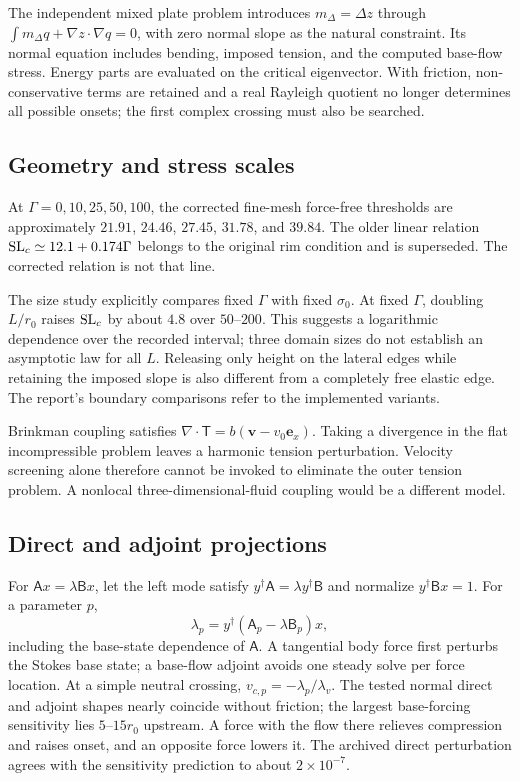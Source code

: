 The independent mixed plate problem introduces $m_\Delta=\Delta z$ through $\int m_\Delta q+\nabla z\cdot\nabla q=0$, with zero normal slope as the natural constraint. Its normal equation includes bending, imposed tension, and the computed base-flow stress. Energy parts are evaluated on the critical eigenvector. With friction, non-conservative terms are retained and a real Rayleigh quotient no longer determines all possible onsets; the first complex crossing must also be searched.

\subsection{Geometry and stress scales}
At $\Gamma=0,10,25,50,100$, the corrected fine-mesh force-free thresholds are approximately $21.91$, $24.46$, $27.45$, $31.78$, and $39.84$. The older linear relation $\mathrm{SL}_c\simeq12.1+0.174\Gamma$ belongs to the original rim condition and is superseded. The corrected relation is not that line.

The size study explicitly compares fixed $\Gamma$ with fixed $\sigma_0$. At fixed $\Gamma$, doubling $L/r_0$ raises $\mathrm{SL}_c$ by about $4.8$ over $50$--$200$. This suggests a logarithmic dependence over the recorded interval; three domain sizes do not establish an asymptotic law for all $L$. Releasing only height on the lateral edges while retaining the imposed slope is also different from a completely free elastic edge. The report's boundary comparisons refer to the implemented variants.

Brinkman coupling satisfies $\nabla\cdot\mathsf T=b(\bm v-v_0\bm e_x)$. Taking a divergence in the flat incompressible problem leaves a harmonic tension perturbation. Velocity screening alone therefore cannot be invoked to eliminate the outer tension problem. A nonlocal three-dimensional-fluid coupling would be a different model.

\subsection{Direct and adjoint projections}
For $\mathsf A x=\lambda\mathsf Bx$, let the left mode satisfy $y^\dagger\mathsf A=\lambda y^\dagger\mathsf B$ and normalize $y^\dagger\mathsf Bx=1$. For a parameter $p$,
\begin{equation}
\lambda_p=y^\dagger(\mathsf A_p-\lambda\mathsf B_p)x,
\end{equation}
including the base-state dependence of $\mathsf A$. A tangential body force first perturbs the Stokes base state; a base-flow adjoint avoids one steady solve per force location. At a simple neutral crossing, $v_{c,p}=-\lambda_p/\lambda_v$. The tested normal direct and adjoint shapes nearly coincide without friction; the largest base-forcing sensitivity lies $5$--$15r_0$ upstream. A force with the flow there relieves compression and raises onset, and an opposite force lowers it. The archived direct perturbation agrees with the sensitivity prediction to about $2\times10^{-7}$.

